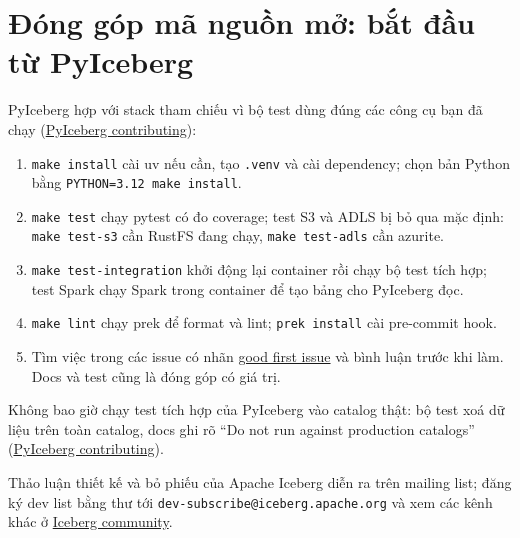 \documentclass[11pt,a4paper,oneside]{report}
\newcommand{\code}[1]{\texttt{#1}}
\begin{document}
\section{Đóng góp mã nguồn mở: bắt đầu từ PyIceberg}
PyIceberg hợp với stack tham chiếu vì bộ test dùng đúng các công cụ bạn đã chạy (\href{https://py.iceberg.apache.org/contributing/}{PyIceberg contributing}):
\begin{enumerate}
  \item \code{make install} cài uv nếu cần, tạo \code{.venv} và cài dependency; chọn bản Python bằng \code{PYTHON=3.12 make install}.
  \item \code{make test} chạy pytest có đo coverage; test S3 và ADLS bị bỏ qua mặc định: \code{make test-s3} cần RustFS đang chạy, \code{make test-adls} cần azurite.
  \item \code{make test-integration} khởi động lại container rồi chạy bộ test tích hợp; test Spark chạy Spark trong container để tạo bảng cho PyIceberg đọc.
  \item \code{make lint} chạy prek để format và lint; \code{prek install} cài pre-commit hook.
  \item Tìm việc trong các issue có nhãn \href{https://github.com/apache/iceberg-python/issues?q=is\%3Aissue+is\%3Aopen+label\%3A\%22good+first+issue\%22}{good first issue} và bình luận trước khi làm. Docs và test cũng là đóng góp có giá trị.
\end{enumerate}
\begin{luuy}
Không bao giờ chạy test tích hợp của PyIceberg vào catalog thật: bộ test xoá dữ liệu trên toàn catalog, docs ghi rõ ``Do not run against production catalogs'' (\href{https://py.iceberg.apache.org/contributing/}{PyIceberg contributing}).
\end{luuy}
Thảo luận thiết kế và bỏ phiếu của Apache Iceberg diễn ra trên mailing list; đăng ký dev list bằng thư tới \code{dev-subscribe@iceberg.apache.org} và xem các kênh khác ở \href{https://iceberg.apache.org/community/}{Iceberg community}.
\end{document}
